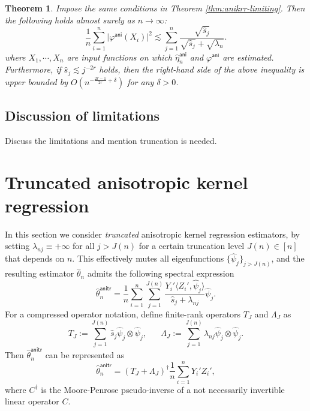 \documentclass[aos]{imsart}
\renewcommand{\hat}{\widehat}
\newcommand{\ani}{\mathsf{ani}}
\newcommand{\anitr}{\mathsf{anitr}}
\theoremstyle{plain}
\newtheorem{theorem}{Theorem}[section]
\theoremstyle{definition}
\theoremstyle{definition}
\begin{document}
\begin{theorem}
Impose the same conditions in Theorem \ref{thm:anikrr-limiting}. Then the following holds almost surely as $n\to\infty$:
$$
\frac{1}{n}\sum_{i=1}^n \big|\varphi^\ani(X_i)\big|^2 \lesssim \sum_{j=1}^n \frac{\sqrt{\hat s_j}}{\sqrt{\hat s_j}+\sqrt{\lambda_n}}.
$$
where $X_1,\cdots,X_n$ are input functions on which $\hat\eta_n^\ani$ and $\varphi^\ani$ are estimated.
Furthermore, if $\hat s_j\lesssim j^{-2r}$ holds, then the right-hand side of the above inequality is upper bounded by $O(n^{-\frac{2r-1}{2r}+\delta})$
for any $\delta>0$.
\label{thm:anikrr-rates}
\end{theorem}

\subsection{Discussion of limitations}

{\color{red} Discuss the limitations and mention truncation is needed.}

\section{Truncated anisotropic kernel regression}\label{sec:anitr}

In this section we consider \emph{truncated} anisotropic kernel regression estimators, by setting $\lambda_{nj}\equiv +\infty$
for all $j> J(n)$ for a certain truncation level $J(n)\in[n]$ that depends on $n$.
This effectively mutes all eigenfunctions $\{\hat\psi_j\}_{j>J(n)}$, and the resulting estimator $\hat\theta_n$ admits the following spectral expression
\begin{equation}
\hat\theta_n^\anitr = \frac{1}{n}\sum_{i=1}^n\sum_{j=1}^{J(n)}\frac{Y_i'\langle Z_i',\hat\psi_j\rangle}{\hat s_j+\lambda_{nj}}\hat\psi_j.
\label{eq:anitr}
\end{equation}
For a compressed operator notation, define finite-rank operators $T_J$ and $\Lambda_J$ as
$$
T_J := \sum_{j=1}^{J(n)}\hat s_j\hat\psi_j\otimes\hat\psi_j,\;\;\;\;\;\; \Lambda_J := \sum_{j=1}^{J(n)}\lambda_{nj}\hat\psi_j\otimes\hat\psi_j.
$$
Then $\hat\theta_n^\anitr$ can be represented as
$$
\hat\theta_n^\anitr = (T_J+\Lambda_J)^{\dagger}\frac{1}{n}\sum_{i=1}^n Y_i'Z_i',
$$
where $C^\dagger$ is the Moore-Penrose pseudo-inverse of a not necessarily invertible linear operator $C$.
\end{document}
